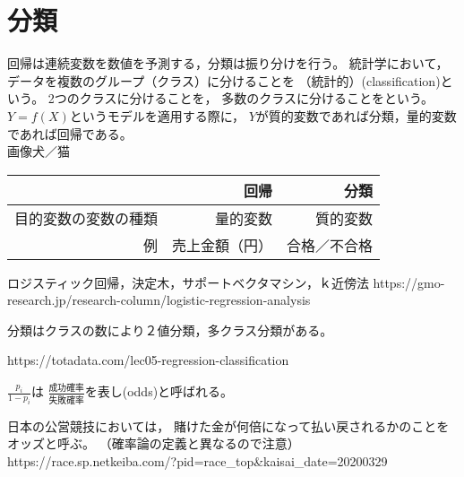 \section{分類}

{
  回帰は連続変数を数値を予測する，分類は振り分けを行う。 
  {
    統計学において，データを複数のグループ（クラス）に分けることを
    （統計的）(classification)という。
    2つのクラスに分けることを，
    多数のクラスに分けることをという。
  }
  $Y=f(X)$というモデルを適用する際に，
  $Y$が質的変数であれば分類，量的変数であれば回帰である。\\
  {
    画像\ra 犬／猫
  }
}

\MyFrame{}
{
  \begin{table}
    \begin{tabular}{rrr}
      \toprule
                           &     回帰 & 分類 \\
      \hline
      目的変数の変数の種類 & 量的変数 & 質的変数\\
      例                   & 売上金額（円）& 合格／不合格\\
      \bottomrule
    \end{tabular}
  \end{table}

  {
    ロジスティック回帰，決定木，サポートベクタマシン，ｋ近傍法
  }
  {https://gmo-research.jp/research-column/logistic-regression-analysis}
}

\MyFrame{\insertsection}
{
  分類はクラスの数により２値分類，多クラス分類がある。

  {https://totadata.com/lec05-regression-classification}
}

{
  {
    $\frac{p_i}{1-p_i}$は
    $\frac{成功確率}{失敗確率}$を表し(odds)と呼ばれる。
  }

  日本の公営競技においては，
  賭けた金が何倍になって払い戻されるかのことをオッズと呼ぶ。
  （確率論の定義と異なるので注意）
  {https://race.sp.netkeiba.com/?pid=race_top&kaisai_date=20200329}
}


